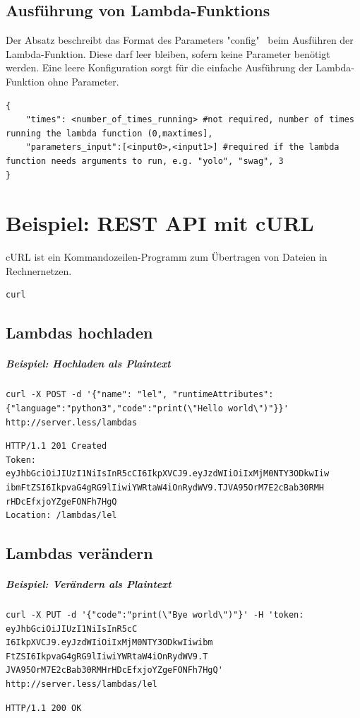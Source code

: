 \documentclass[a4paper,20pt,oneside]{book}
\begin{document}
\subsection{Ausführung von \glspl{Lambda-Funktion}}
Der Absatz beschreibt das Format des Parameters "config" \ beim Ausführen der \gls{Lambda-Funktion}. Diese darf leer bleiben, sofern keine Parameter benötigt werden. Eine leere Konfiguration sorgt für die einfache Ausführung der  \gls{Lambda-Funktion} ohne Parameter.
\begin{lstlisting}
{
	"times": <number_of_times_running> #not required, number of times running the lambda function (0,maxtimes],
	"parameters_input":[<input0>,<input1>] #required if the lambda function needs arguments to run, e.g. "yolo", "swag", 3 
}
\end{lstlisting}

\newpage

\section{Beispiel: REST \Gls{API} mit cURL}
cURL ist ein Kommandozeilen-Programm zum Übertragen von Dateien in Rechnernetzen.
\begin{lstlisting}
curl
\end{lstlisting}
\subsection{Lambdas hochladen}
\subparagraph{Beispiel: Hochladen als Plaintext}
\begin{lstlisting}
curl -X POST -d '{"name": "lel", "runtimeAttributes":{"language":"python3","code":"print(\"Hello world\")"}}' http://server.less/lambdas
\end{lstlisting}
\begin{lstlisting}
HTTP/1.1 201 Created
Token: eyJhbGciOiJIUzI1NiIsInR5cCI6IkpXVCJ9.eyJzdWIiOiIxMjM0NTY3ODkwIiw
ibmFtZSI6IkpvaG4gRG9lIiwiYWRtaW4iOnRydWV9.TJVA95OrM7E2cBab30RMH
rHDcEfxjoYZgeFONFh7HgQ
Location: /lambdas/lel
\end{lstlisting}
\subsection{Lambdas verändern}
\subparagraph{Beispiel: Verändern als Plaintext}
\begin{lstlisting}
curl -X PUT -d '{"code":"print(\"Bye world\")"}' -H 'token: eyJhbGciOiJIUzI1NiIsInR5cC
I6IkpXVCJ9.eyJzdWIiOiIxMjM0NTY3ODkwIiwibm
FtZSI6IkpvaG4gRG9lIiwiYWRtaW4iOnRydWV9.T
JVA95OrM7E2cBab30RMHrHDcEfxjoYZgeFONFh7HgQ' http://server.less/lambdas/lel
\end{lstlisting}
\begin{lstlisting}
HTTP/1.1 200 OK
\end{lstlisting}
\end{document}
